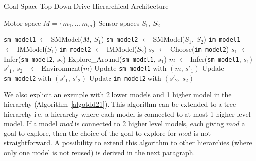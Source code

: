 \documentclass[12pt]{article}
\begin{document}
			
			\begin{algorithm}[H]
				\caption{Goal-Space Top-Down Drive Hierarchical Architecture}
				\label{algotdd}
				\begin{algorithmic}[1]
					\Require Motor space $M = \{m_1, ...~ m_m\}$
					\Require Sensor spaces $S_1,~S_2$
					
					\State \texttt{sm\_model1} $\gets$ SMModel($M,~S_1$)
					\State \texttt{sm\_model2} $\gets$ SMModel($S_1,~S_2$)
					\State \texttt{im\_model1} $\gets$ IMModel($S_1$)
					\State \texttt{im\_model2} $\gets$ IMModel($S_2$)
					\Loop
						\State $s_2$ $\gets$ Choose(\texttt{im\_model2})
						\State $s_1$ $\gets$ Infer(\texttt{sm\_model2}, $s_2$)
						\State Explore\_Around(\texttt{sm\_model1}, $s_1$)
						\State $m$ $\gets$ Infer(\texttt{sm\_model1}, $s_1$)
						\State $s'_1,~s_2$~ $\gets$ Environment($m$)
						\State Update \texttt{sm\_model1} with $(m,~s'_1)$
						\State Update \texttt{sm\_model2} with $(s'_1,~s'_2)$
						\State Update \texttt{im\_model2} with $(s'_2,~s_2)$
					\EndLoop
				\end{algorithmic}
			\end{algorithm}
				
			We also explicit an exemple with 2 lower models and 1 higher model in the hierarchy (Algorithm~\ref{algotdd21}).
			This algorithm can be extended to a tree hierarchy i.e. a hierarchy where each model is connected to at most 1 higher level model.
			If a model $mod$ is connected to 2 higher level models, each giving $mod$ a goal to explore, then the choice of the goal to explore for $mod$ is not straightforward.
			A possibility to extend this algorithm to other hierarchies (where only one model is not reused) is derived in the next paragraph.
\end{document}
